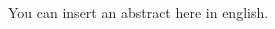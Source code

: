 \newpage
\renewcommand{\thepage}{\roman{page}}

\begin{changemargin}{1cm}{1cm}

\begin{Abstract}
\thispagestyle{plain}
\vspace{1cm}



You can insert an abstract here in english.





\end{Abstract}
\end{changemargin}
